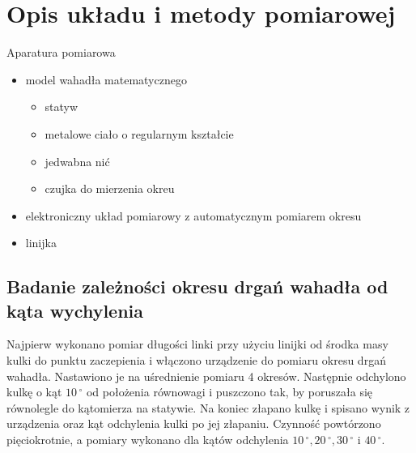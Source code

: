 \documentclass[a4paper,10pt]{article}
\begin{document}
\section{Opis układu i metody pomiarowej}
Aparatura pomiarowa
\begin{itemize}
  \item model wahadła matematycznego
\begin{itemize}
  \item statyw
  \item metalowe ciało o regularnym kształcie
  \item jedwabna nić
  \item czujka do mierzenia okreu
\end{itemize}
  \item elektroniczny układ pomiarowy z automatycznym pomiarem okresu
  \item linijka
\end{itemize}
 
\subsection{Badanie zależności okresu drgań wahadła od kąta wychylenia}
Najpierw wykonano pomiar długości linki przy użyciu linijki od środka masy kulki do punktu zaczepienia  i włączono urządzenie do pomiaru okresu drgań wahadła. Nastawiono je na uśrednienie pomiaru 4 okresów. Następnie odchylono kulkę o kąt $10\,^{\circ}$ od położenia równowagi i puszczono tak, by poruszała się równolegle do kątomierza na statywie. Na koniec złapano kulkę i spisano wynik z urządzenia oraz kąt odchylenia kulki po jej złapaniu. Czynność powtórzono pięciokrotnie, a pomiary wykonano dla kątów odchylenia  $10\,^{\circ}, 20\,^{\circ}, 30\,^{\circ}$ i $40\,^{\circ}$.
\\
\end{document}
